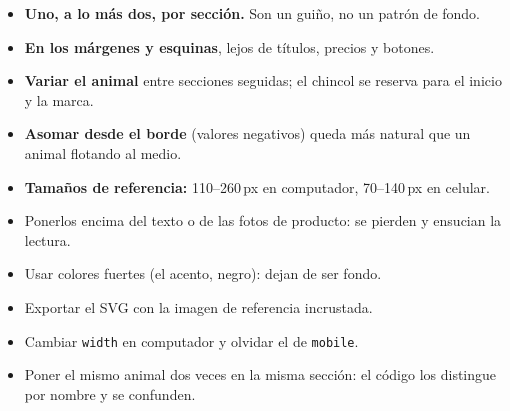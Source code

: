 \documentclass[11pt,a4paper]{article}
\newcommand{\code}[1]{\texttt{\small #1}}
\begin{document}
\begin{itemize}
  \item \textbf{Uno, a lo más dos, por sección.} Son un guiño, no un patrón de fondo.
  \item \textbf{En los márgenes y esquinas}, lejos de títulos, precios y botones.
  \item \textbf{Variar el animal} entre secciones seguidas; el chincol se reserva para el inicio y la marca.
  \item \textbf{Asomar desde el borde} (valores negativos) queda más natural que un animal flotando al medio.
  \item \textbf{Tamaños de referencia:} 110--260\,px en computador, 70--140\,px en celular.
\end{itemize}

\vspace{1ex}
\begin{evitar}
\begin{itemize}[leftmargin=1.2em]
  \item Ponerlos encima del texto o de las fotos de producto: se pierden y ensucian la lectura.
  \item Usar colores fuertes (el acento, negro): dejan de ser fondo.
  \item Exportar el SVG con la imagen de referencia incrustada.
  \item Cambiar \code{width} en computador y olvidar el de \code{mobile}.
  \item Poner el mismo animal dos veces en la misma sección: el código los distingue por nombre y se confunden.
\end{itemize}
\end{evitar}
\end{document}
